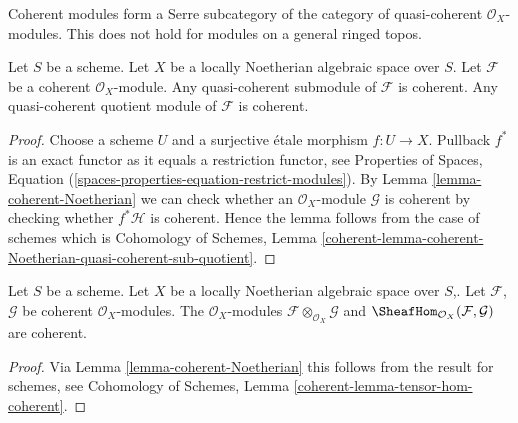 \noindent
Coherent modules form a Serre subcategory of the
category of quasi-coherent $\mathcal{O}_X$-modules. This does not hold
for modules on a general ringed topos.

\begin{lemma}
\label{lemma-coherent-Noetherian-quasi-coherent-sub-quotient}
Let $S$ be a scheme.
Let $X$ be a locally Noetherian algebraic space over $S$.
Let $\mathcal{F}$ be a coherent $\mathcal{O}_X$-module.
Any quasi-coherent submodule of $\mathcal{F}$ is coherent.
Any quasi-coherent quotient module of $\mathcal{F}$ is coherent.
\end{lemma}

\begin{proof}
Choose a scheme $U$ and a surjective \'etale morphism $f : U \to X$.
Pullback $f^*$ is an exact functor as it equals a restriction functor, see
Properties of Spaces, Equation
(\ref{spaces-properties-equation-restrict-modules}).
By
Lemma \ref{lemma-coherent-Noetherian} we can check whether an
$\mathcal{O}_X$-module $\mathcal{G}$ is
coherent by checking whether $f^*\mathcal{H}$ is coherent. Hence the
lemma follows from the case of schemes which is
Cohomology of Schemes, Lemma
\ref{coherent-lemma-coherent-Noetherian-quasi-coherent-sub-quotient}.
\end{proof}

\begin{lemma}
\label{lemma-tensor-hom-coherent}
Let $S$ be a scheme.
Let $X$ be a locally Noetherian algebraic space over $S$,.
Let $\mathcal{F}$, $\mathcal{G}$ be coherent $\mathcal{O}_X$-modules.
The $\mathcal{O}_X$-modules $\mathcal{F} \otimes_{\mathcal{O}_X} \mathcal{G}$
and $\SheafHom_{\mathcal{O}_X}(\mathcal{F}, \mathcal{G})$ are
coherent.
\end{lemma}

\begin{proof}
Via Lemma \ref{lemma-coherent-Noetherian} this follows from the result
for schemes, see
Cohomology of Schemes, Lemma \ref{coherent-lemma-tensor-hom-coherent}.
\end{proof}

